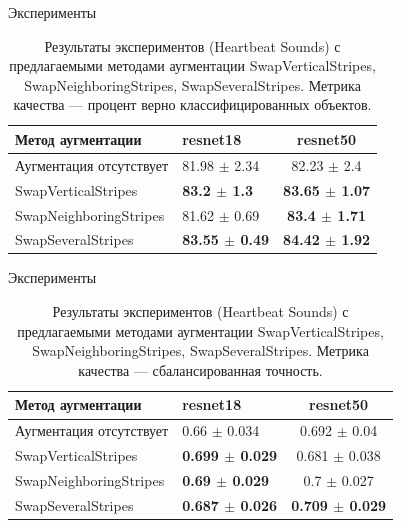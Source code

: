 \documentclass[12pt, fleqn]{beamer}
\begin{document}
\begin{frame}{Эксперименты}
	\begin{table}[ht!]
    \centering
	\begin{tabular}{| l | l | c |}
    	\hline
	    Метод аугментации & resnet18 & resnet50 \\ \hline
	    Аугментация отсутствует  & 81.98 $\pm$ 2.34 & 82.23 $\pm$ 2.4 \\ \hline
	    SwapVerticalStripes & \textbf{83.2 $\pm$ 1.3} & \textbf{83.65 $\pm$ 1.07} \\ \hline
	    SwapNeighboringStripes & 81.62 $\pm$ 0.69 & \textbf{83.4 $\pm$ 1.71} \\ \hline
	    SwapSeveralStripes & \textbf{83.55 $\pm$ 0.49} & \textbf{84.42 $\pm$ 1.92} \\ \hline
	\end{tabular}
	\caption{Результаты экспериментов (Heartbeat Sounds) с предлагаемыми методами аугментации SwapVerticalStripes, SwapNeighboringStripes, SwapSeveralStripes. Метрика качества --- процент верно классифицированных объектов.}
	\label{table:lukianov_pavel_t1}
    \end{table}
\end{frame}

\begin{frame}{Эксперименты}
\begin{table}[ht!]
	\centering
	\begin{tabular}{| l | l | c |}
    	\hline
	    Метод аугментации & resnet18 & resnet50 \\ \hline
	    Аугментация отсутствует  & 0.66 $\pm$ 0.034 & 0.692 $\pm$ 0.04 \\ \hline
	    SwapVerticalStripes & \textbf{0.699 $\pm$ 0.029} & 0.681 $\pm$ 0.038 \\ \hline
	    SwapNeighboringStripes & \textbf{0.69 $\pm$ 0.029} & 0.7 $\pm$ 0.027 \\ \hline
	    SwapSeveralStripes & \textbf{0.687 $\pm$ 0.026} & \textbf{0.709 $\pm$ 0.029} \\ \hline
	\end{tabular}
	\caption{Результаты экспериментов (Heartbeat Sounds) с предлагаемыми методами аугментации SwapVerticalStripes, SwapNeighboringStripes, SwapSeveralStripes. Метрика качества --- сбалансированная точность.}
	\label{table:lukianov_pavel_t1}
\end{table}
\end{frame}
\end{document}
